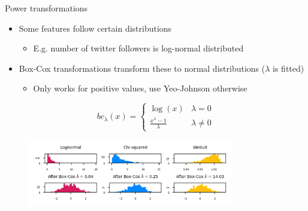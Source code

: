 \begin{frame}{Power transformations}
    \begin{itemize}
        \item Some features follow certain distributions
        \begin{itemize}
            \item E.g. number of twitter followers is log-normal distributed
        \end{itemize}
        \item Box-Cox transformations transform these to normal distributions ($\lambda$ is fitted)
        \begin{itemize}
            \item Only works for positive values, use Yeo-Johnson otherwise
        \end{itemize}
    \end{itemize}

    \[
        bc_\lambda(x) =
        \begin{cases}
            \log(x) & \lambda = 0 \\
            \frac{x^\lambda - 1}{\lambda} & \lambda \neq 0
        \end{cases}
    \]

    \begin{figure}
        \centering
        \includegraphics[width=0.8\textwidth,keepaspectratio]{images/pre-processing/power_transformation.png}
    \end{figure}
\end{frame}
